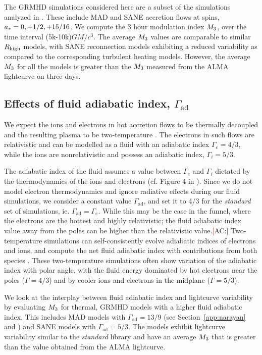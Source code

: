 The GRMHD simulations considered here are a subset of the simulations analyzed in \citealt{2020MNRAS.494.4168D}. These include MAD and SANE accretion flows at spins, $a_* = 0,+1/2,+15/16$. We compute the 3 hour modulation index $M_{3}$, over the time interval (5k-10k)$GM/c^{3}$. The average $M_{3}$ values are comparable to similar $R_\mathrm{high}$ models, with SANE reconnection models exhibiting a reduced variability as compared to the corresponding turbulent heating models. However, the average $M_{3}$ for all the models is greater than the $M_{3}$ measured from the ALMA lightcurve on three days.

\subsection{Effects of fluid adiabatic index, \texorpdfstring{$\Gamma_\mathrm{ad}$}{Gad}}

We expect the ions and electrons in hot accretion flows to be thermally decoupled and the resulting plasma to be two-temperature \citep{1976ApJ...204..187S, Quataert_1998, 10.1093/mnras/stw3116, Ryan_2018, Chael2018}. The electrons in such flows are relativistic and can be modelled as a fluid with an adiabatic index $\Gamma_{e}=4/3$, while the ions are nonrelativistic and possess an adiabatic index, $\Gamma_{i}=5/3$.

The adiabatic index of the fluid assumes a value between $\Gamma_{e}$ and $\Gamma_{i}$ dictated by the thermodynamics of the ions and electrons (cf. Figure 4 in \citealt{10.1093/mnras/stw3116}). Since we do not model electron thermodynamics and ignore radiative effects during our fluid simulations, we consider a constant value $\Gamma_\mathrm{ad}$, and set it to 4/3 for the \textit{standard} set of simulations, ie. $\Gamma_\mathrm{ad}=\Gamma_{e}$. While this may be the case in the funnel, where the electrons are the hottest and highly relativistic; the fluid adiabatic index value away from the poles can be higher than the relativistic value.{\textcolor{red} [AC:] Two-temperature simulations can self-consistently evolve adiabatic indices of electrons and ions, and compute the net fluid adiabatic index with contributions from both species \cite{10.1093/mnras/stw3116}. These two-temperature simulations often show variation of the adiabatic index with polar angle, with the fluid energy dominated by hot electrons near the poles ($\Gamma = 4/3$) and by cooler ions and  electrons in the midplane ($\Gamma=5/3$).}

We look at the interplay between fluid adiabatic index and lightcurve variability by evaluating $M_{3}$ for thermal, GRMHD models with a higher fluid adiabatic index. This includes MAD models with $\Gamma_\mathrm{ad}=13/9$ (see Section~\ref{app:narayan} and  \citealt{2021arXiv210812380N}) and SANE models with $\Gamma_\mathrm{ad}=5/3$. The models exhibit lightcurve variability similar to the \textit{standard} library and have an average $M_{3}$ that is greater than the value obtained from the ALMA lightcurve.
